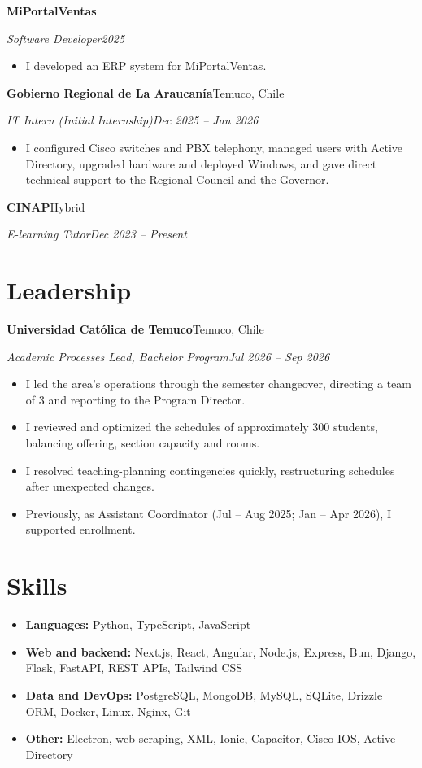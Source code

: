 \documentclass[10pt,letterpaper]{article}
\newcommand{\entry}[4]{%
  \textbf{#1}\hfill #2\par\nopagebreak
  \textit{#3}\hfill \textit{#4}\par\nopagebreak\vspace{0.05em}}
\newcommand{\gap}{\vspace{0.22em}}
\begin{document}
\gap
\entry{MiPortalVentas}{}{Software Developer}{2025}
\begin{itemize}
  \item I developed an ERP system for MiPortalVentas.
\end{itemize}
\gap
\entry{Gobierno Regional de La Araucanía}{Temuco, Chile}{IT Intern (Initial Internship)}{Dec 2025 -- Jan 2026}
\begin{itemize}
  \item I configured Cisco switches and PBX telephony, managed users with Active Directory, upgraded hardware and deployed Windows, and gave direct technical support to the Regional Council and the Governor.
\end{itemize}
\gap
\entry{CINAP}{Hybrid}{E-learning Tutor}{Dec 2023 -- Present}

\section{Leadership}
\entry{Universidad Católica de Temuco}{Temuco, Chile}{Academic Processes Lead, Bachelor Program}{Jul 2026 -- Sep 2026}
\begin{itemize}
  \item I led the area's operations through the semester changeover, directing a team of 3 and reporting to the Program Director.
  \item I reviewed and optimized the schedules of approximately 300 students, balancing offering, section capacity and rooms.
  \item I resolved teaching-planning contingencies quickly, restructuring schedules after unexpected changes.
  \item Previously, as Assistant Coordinator (Jul -- Aug 2025; Jan -- Apr 2026), I supported enrollment.
\end{itemize}

\section{Skills}
\begin{itemize}[label={}, leftmargin=0pt]
  \item \textbf{Languages:} Python, TypeScript, JavaScript
  \item \textbf{Web and backend:} Next.js, React, Angular, Node.js, Express, Bun, Django, Flask, FastAPI, REST APIs, Tailwind CSS
  \item \textbf{Data and DevOps:} PostgreSQL, MongoDB, MySQL, SQLite, Drizzle ORM, Docker, Linux, Nginx, Git
  \item \textbf{Other:} Electron, web scraping, XML, Ionic, Capacitor, Cisco IOS, Active Directory
\end{itemize}
\end{document}
